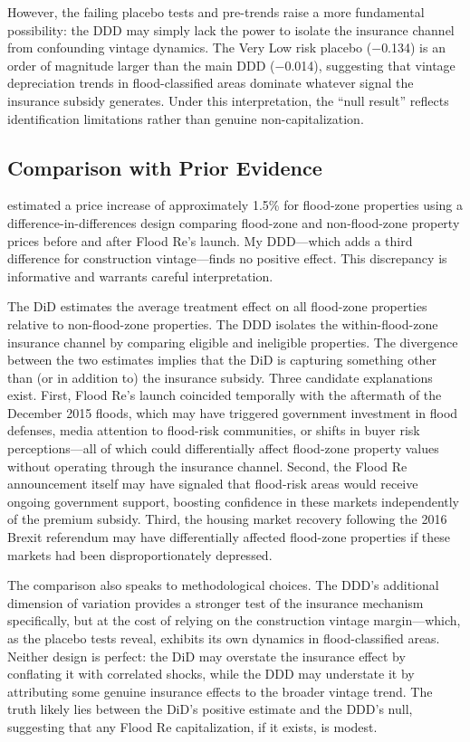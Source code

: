 \documentclass[12pt]{article}
\begin{document}
However, the failing placebo tests and pre-trends raise a more fundamental possibility: the DDD may simply lack the power to isolate the insurance channel from confounding vintage dynamics. The Very Low risk placebo ($-$0.134) is an order of magnitude larger than the main DDD ($-$0.014), suggesting that vintage depreciation trends in flood-classified areas dominate whatever signal the insurance subsidy generates. Under this interpretation, the ``null result'' reflects identification limitations rather than genuine non-capitalization.

\subsection{Comparison with Prior Evidence}

\citet{garbarino2024effect} estimated a price increase of approximately 1.5\% for flood-zone properties using a difference-in-differences design comparing flood-zone and non-flood-zone property prices before and after Flood Re's launch. My DDD---which adds a third difference for construction vintage---finds no positive effect. This discrepancy is informative and warrants careful interpretation.

The DiD estimates the average treatment effect on all flood-zone properties relative to non-flood-zone properties. The DDD isolates the within-flood-zone insurance channel by comparing eligible and ineligible properties. The divergence between the two estimates implies that the DiD is capturing something other than (or in addition to) the insurance subsidy. Three candidate explanations exist. First, Flood Re's launch coincided temporally with the aftermath of the December 2015 floods, which may have triggered government investment in flood defenses, media attention to flood-risk communities, or shifts in buyer risk perceptions---all of which could differentially affect flood-zone property values without operating through the insurance channel. Second, the Flood Re announcement itself may have signaled that flood-risk areas would receive ongoing government support, boosting confidence in these markets independently of the premium subsidy. Third, the housing market recovery following the 2016 Brexit referendum may have differentially affected flood-zone properties if these markets had been disproportionately depressed.

The comparison also speaks to methodological choices. The DDD's additional dimension of variation provides a stronger test of the insurance mechanism specifically, but at the cost of relying on the construction vintage margin---which, as the placebo tests reveal, exhibits its own dynamics in flood-classified areas. Neither design is perfect: the DiD may overstate the insurance effect by conflating it with correlated shocks, while the DDD may understate it by attributing some genuine insurance effects to the broader vintage trend. The truth likely lies between the DiD's positive estimate and the DDD's null, suggesting that any Flood Re capitalization, if it exists, is modest.
\end{document}
